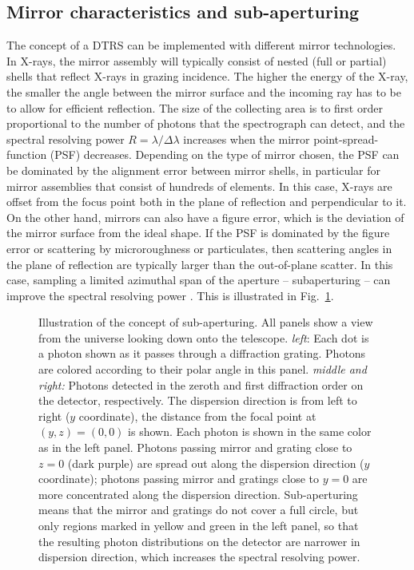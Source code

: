 \documentclass[linenumbers]{aastex631}
\begin{document}
\subsection{Mirror characteristics and sub-aperturing}
The concept of a DTRS can be implemented with different mirror technologies. In X-rays, the mirror assembly will typically consist of nested (full or partial) shells that reflect X-rays in grazing incidence. The higher the energy of the X-ray, the smaller the angle between the mirror surface and the incoming ray has to be to allow for efficient reflection. The size of the collecting area is to first order proportional to the number of photons that the spectrograph can detect, and the spectral resolving power $R=\lambda / \Delta \lambda$ increases when the mirror point-spread-function (PSF) decreases. Depending on the type of mirror chosen, the PSF can be dominated by the alignment error between mirror shells, in particular for mirror assemblies that consist of hundreds of elements. In this case, X-rays are offset from the focus point both in the plane of reflection and perpendicular to it.
On the other hand, mirrors can also have a figure error, which is the deviation of the mirror surface from the ideal shape. If the PSF is dominated by the figure error or scattering by microroughness or particulates, then scattering angles in the plane of reflection are typically larger than the out-of-plane scatter. In this case, sampling a limited azimuthal span of the aperture -- subaperturing -- can improve the spectral resolving power \citep{1987ApOpt..26.2915C,2010SPIE.7732E..1JH}. This is illustrated in Fig.~\ref{fig:subaperture}.


\begin{figure}
\caption{
    Illustration of the concept of sub-aperturing. All panels show a view from the universe looking down onto the telescope. \emph{left}: Each dot is a photon shown as it passes through a diffraction grating. Photons are colored according to their polar angle in this panel. \emph{middle and right:} Photons detected in the zeroth and first diffraction order on the detector, respectively. The dispersion direction is from left to right ($y$ coordinate), the distance from the focal point at $(y, z) = (0, 0)$ is shown. Each photon is shown in the same color as in the left panel. Photons passing mirror and grating close to $z=0$ (dark purple) are spread out along the dispersion direction ($y$ coordinate); photons passing mirror and gratings close to $y=0$ are more concentrated along the dispersion direction. Sub-aperturing means that the mirror and gratings do not cover a full circle, but only regions marked in yellow and green in the left panel, so that the resulting photon distributions on the detector are narrower in dispersion direction, which increases the spectral resolving power.}
\label{fig:subaperture}
\end{figure}
\end{document}
